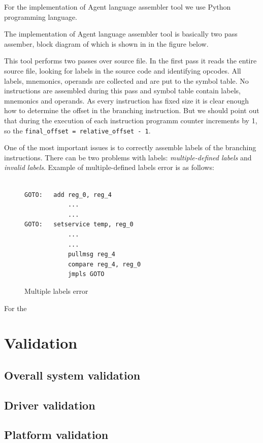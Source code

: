 \documentclass{scrreprt}
\begin{document}
For the implementation of Agent language assembler tool we use Python programming language.


The implementation of Agent language assembler tool is basically two pass assember, block diagram of which is shown in 
in the figure below.

This tool performs two passes over source file. In the first pass it reads the entire source file,
looking for labels in the source code and identifying opcodes.
All labels, mnemonics, operands are collected and are put to the symbol table.
No instructions are assembled during this pass and symbol table contain labels, mnemonics and operands.
As every instruction has fixed size it is clear enough how to determine the offset in the branching instruction.
But we should point out that during the execution of each instruction programm counter increments by 1, so the 
\texttt{final_offset = relative_offset - 1}.


One of the most important issues is to correctly assemble labels of the branching instructions.
There can be two problems with labels: \emph{multiple-defined labels} and \emph{invalid labels}.
Example of multiple-defined labels error is as follows:


\begin{figure}[!htb]
\lstset{tabsize=2}
\begin{lstlisting}[frame=single]
	
GOTO:	add reg_0, reg_4
			...
			...
GOTO:	setservice temp, reg_0
			...
			...
			pullmsg reg_4
			compare reg_4, reg_0
			jmpls GOTO
\end{lstlisting}
\caption{Multiple labels error}
\label{fig:multlabels}
\end{figure}

For the 


\chapter{Validation}

\section{Overall system validation}

\section{Driver validation}

\section{Platform validation}
\end{document}
